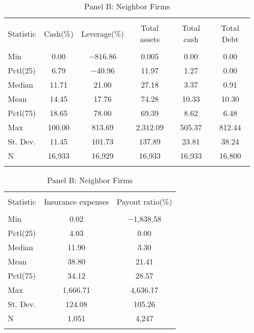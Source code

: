 \begin{table}[!htbp] \centering 
  \caption{Panel B: Neighbor Firms} 
  \label{} 
\begin{tabular}{@{\extracolsep{5pt}}lccccc} 
\\[-1.8ex]\hline 
\hline \\[-1.8ex] 
Statistic & Cash(\%) & Leverage(\%) & Total assets & Total cash & Total Debt \\ 
\hline \\[-1.8ex] 
Min & 0.00 & $-$816.86 & 0.005 & 0.00 & 0.00 \\ 
Pctl(25) & 6.79 & $-$40.96 & 11.97 & 1.27 & 0.00 \\ 
Median & 11.71 & 21.00 & 27.18 & 3.37 & 0.91 \\ 
Mean & 14.45 & 17.76 & 74.28 & 10.33 & 10.30 \\ 
Pctl(75) & 18.65 & 78.00 & 69.39 & 8.62 & 6.48 \\ 
Max & 100.00 & 813.69 & 2,312.09 & 505.37 & 812.44 \\ 
St. Dev. & 11.45 & 101.73 & 137.89 & 23.81 & 38.24 \\ 
N & 16,933 & 16,929 & 16,933 & 16,933 & 16,800 \\ 
\hline \\[-1.8ex] 
\end{tabular} 
\end{table} 

\begin{table}[!htbp] \centering 
  \caption{Panel B: Neighbor Firms} 
  \label{} 
\begin{tabular}{@{\extracolsep{5pt}}lcc} 
\\[-1.8ex]\hline 
\hline \\[-1.8ex] 
Statistic & Insurance expenses & Payout ratio(\%) \\ 
\hline \\[-1.8ex] 
Min & 0.02 & $-$1,838.58 \\ 
Pctl(25) & 4.03 & 0.00 \\ 
Median & 11.90 & 3.30 \\ 
Mean & 38.80 & 21.41 \\ 
Pctl(75) & 34.12 & 28.57 \\ 
Max & 1,666.71 & 4,636.17 \\ 
St. Dev. & 124.08 & 105.26 \\ 
N & 1,051 & 4,247 \\ 
\hline \\[-1.8ex] 
\end{tabular} 
\end{table} 

